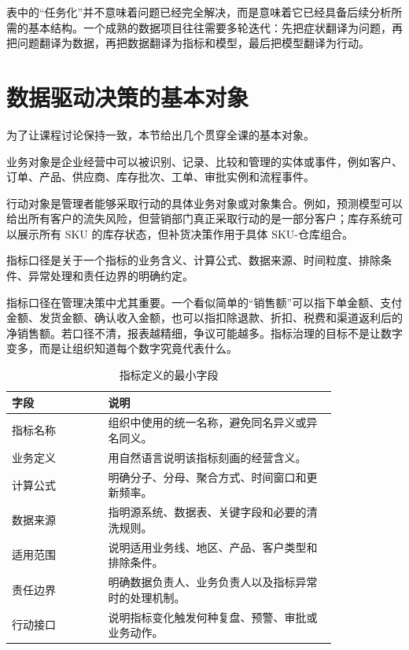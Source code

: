 \documentclass[UTF8,fontset=fandol,openany,zihao=-4]{ctexbook}
\begin{document}
表中的“任务化”并不意味着问题已经完全解决，而是意味着它已经具备后续分析所需的基本结构。一个成熟的数据项目往往需要多轮迭代：先把症状翻译为问题，再把问题翻译为数据，再把数据翻译为指标和模型，最后把模型翻译为行动。

\section{数据驱动决策的基本对象}

为了让课程讨论保持一致，本节给出几个贯穿全课的基本对象。

\begin{definition}[业务对象]
业务对象是企业经营中可以被识别、记录、比较和管理的实体或事件，例如客户、订单、产品、供应商、库存批次、工单、审批实例和流程事件。
\end{definition}

\begin{definition}[行动对象]
行动对象是管理者能够采取行动的具体业务对象或对象集合。例如，预测模型可以给出所有客户的流失风险，但营销部门真正采取行动的是一部分客户；库存系统可以展示所有 SKU 的库存状态，但补货决策作用于具体 SKU-仓库组合。
\end{definition}

\begin{definition}[指标口径]
指标口径是关于一个指标的业务含义、计算公式、数据来源、时间粒度、排除条件、异常处理和责任边界的明确约定。
\end{definition}

指标口径在管理决策中尤其重要。一个看似简单的“销售额”可以指下单金额、支付金额、发货金额、确认收入金额，也可以指扣除退款、折扣、税费和渠道返利后的净销售额。若口径不清，报表越精细，争议可能越多。指标治理的目标不是让数字变多，而是让组织知道每个数字究竟代表什么。

\begin{table}[htbp]
\centering
\caption{指标定义的最小字段}
\begin{tabular}{p{0.24\linewidth}p{0.58\linewidth}}
\toprule
字段 & 说明\\
\midrule
指标名称 & 组织中使用的统一名称，避免同名异义或异名同义。\\
业务定义 & 用自然语言说明该指标刻画的经营含义。\\
计算公式 & 明确分子、分母、聚合方式、时间窗口和更新频率。\\
数据来源 & 指明源系统、数据表、关键字段和必要的清洗规则。\\
适用范围 & 说明适用业务线、地区、产品、客户类型和排除条件。\\
责任边界 & 明确数据负责人、业务负责人以及指标异常时的处理机制。\\
行动接口 & 说明指标变化触发何种复盘、预警、审批或业务动作。\\
\bottomrule
\end{tabular}
\end{table}
\end{document}

